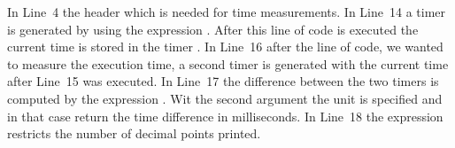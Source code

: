 In Line~4 the  header which is needed for time measurements. In Line~14 a timer  is generated by using the expression . After this line of code is executed the current time is stored in the timer . In Line~16 after the line of code, we wanted to measure the execution time, a second timer  is generated with the current time after Line~15 was executed. In Line~17 the difference between the two timers is computed by the expression . Wit the second argument the unit is specified and in that case  return the time difference in milliseconds. In Line~18 the expression  restricts the number of decimal points printed.\\

